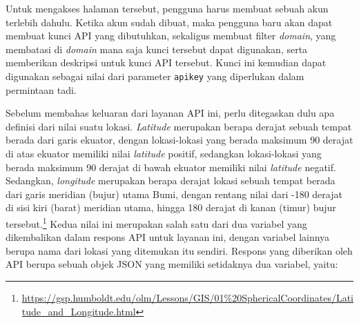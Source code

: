 Untuk mengakses halaman tersebut, pengguna harus membuat sebuah akun terlebih dahulu. Ketika akun sudah dibuat, maka pengguna baru akan dapat membuat kunci API yang dibutuhkan, sekaligus membuat filter \textit{domain}, yang membatasi di \textit{domain} mana saja kunci tersebut dapat digunakan, serta memberikan deskripsi untuk kunci API tersebut. Kunci ini kemudian dapat digunakan sebagai nilai dari parameter \verb|apikey| yang diperlukan dalam permintaan tadi.

Sebelum membahas keluaran dari layanan API ini, perlu ditegaskan dulu apa definisi dari nilai \latlon\xspace suatu lokasi. \textit{Latitude} merupakan berapa derajat sebuah tempat berada dari garis ekuator, dengan lokasi-lokasi yang berada maksimum 90 derajat di atas ekuator memiliki nilai \textit{latitude} positif, sedangkan lokasi-lokasi yang berada maksimum 90 derajat di bawah ekuator memiliki nilai \textit{latitude} negatif. Sedangkan, \textit{longitude} merupakan berapa derajat lokasi sebuah tempat berada dari garis meridian (bujur) utama Bumi, dengan rentang nilai dari -180 derajat di sisi kiri (barat) meridian utama, hingga 180 derajat di kanan (timur) bujur tersebut.\footnote{\href{https://gsp.humboldt.edu/olm/Lessons/GIS/01\%20SphericalCoordinates/Latitude\_and\_Longitude.html}{https://gsp.humboldt.edu/olm/Lessons/GIS/01\%20SphericalCoordinates/Latitude\_and\_Longitude.html}} Kedua nilai ini merupakan salah satu dari dua variabel yang dikembalikan dalam respons API untuk layanan ini, dengan variabel lainnya berupa nama dari lokasi yang ditemukan itu sendiri. Respons yang diberikan oleh API berupa sebuah objek JSON yang memiliki setidaknya dua variabel, yaitu:

